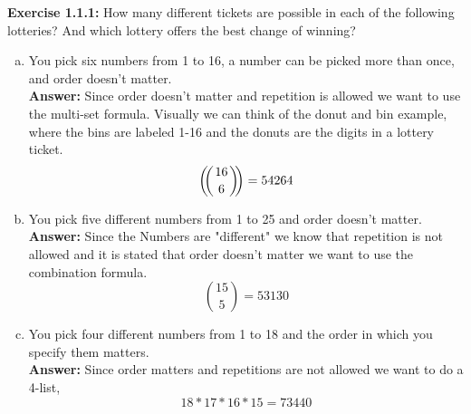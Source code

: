 \documentclass{amsart}
\def\multiset#1#2{\ensuremath{\left(\kern-.3em\left(\genfrac{}{}{0pt}{}{#1}{#2}\right)\kern-.3em\right)}}
\begin{document}
\thispagestyle{fancy}

\noindent\textbf{Exercise 1.1.1: } How many different tickets are possible in each of the following lotteries? And which lottery offers the best change of winning?
\begin{enumerate}[(a)]
\item You pick six numbers from 1 to 16, a number can be picked more than once, and order doesn't matter.\\

\noindent \textbf{Answer: }
Since order doesn't matter and repetition is allowed we want to use the multi-set formula. Visually we can think of the donut and bin example, where the bins are labeled 1-16 and the donuts are the digits in a lottery ticket.
\begin{equation}
\multiset{16}{6}= 54264
\end{equation}
\vspace{1in}

\item You pick five different numbers from 1 to 25 and order doesn't matter.\\

\noindent \textbf{Answer: }
Since the Numbers are "different" we know that repetition is not allowed and it is stated that order doesn't matter we want to use the combination formula.
\begin{equation}
{15\choose5} = 53130
\end{equation}
\vspace{1in}

\item You pick four different numbers from 1 to 18 and the order in which you specify them matters. \\

\noindent \textbf{Answer: }
Since order matters and repetitions are not allowed we want to do a 4-list,
\begin{equation}
18*17*16*15=73440
\end{equation}
\vspace{1in}

\end{enumerate}
\end{document}
